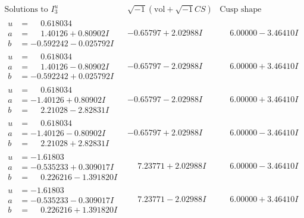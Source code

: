 \documentclass[1p]{elsarticle_modified}
\theoremstyle{definition}
\newcommand{\I}{\sqrt{-1}}
\begin{document}
$$\begin{array}{c|c|c}  
\text{Solutions to }I^u_{3}& \I (\text{vol} + \sqrt{-1}CS) & \text{Cusp shape}\\
 \hline 
\begin{aligned}
u &= \phantom{-}0.618034\phantom{ +0.000000I} \\
a &= \phantom{-}1.40126 + 0.80902 I \\
b &= -0.592242 - 0.025792 I\end{aligned}
 & -0.65797 + 2.02988 I & \phantom{-}6.00000 - 3.46410 I \\ \hline\begin{aligned}
u &= \phantom{-}0.618034\phantom{ +0.000000I} \\
a &= \phantom{-}1.40126 - 0.80902 I \\
b &= -0.592242 + 0.025792 I\end{aligned}
 & -0.65797 - 2.02988 I & \phantom{-}6.00000 + 3.46410 I \\ \hline\begin{aligned}
u &= \phantom{-}0.618034\phantom{ +0.000000I} \\
a &= -1.40126 + 0.80902 I \\
b &= \phantom{-}2.21028 - 2.82831 I\end{aligned}
 & -0.65797 - 2.02988 I & \phantom{-}6.00000 + 3.46410 I \\ \hline\begin{aligned}
u &= \phantom{-}0.618034\phantom{ +0.000000I} \\
a &= -1.40126 - 0.80902 I \\
b &= \phantom{-}2.21028 + 2.82831 I\end{aligned}
 & -0.65797 + 2.02988 I & \phantom{-}6.00000 - 3.46410 I \\ \hline\begin{aligned}
u &= -1.61803\phantom{ +0.000000I} \\
a &= -0.535233 + 0.309017 I \\
b &= \phantom{-}0.226216 - 1.391820 I\end{aligned}
 & \phantom{-}7.23771 + 2.02988 I & \phantom{-}6.00000 - 3.46410 I \\ \hline\begin{aligned}
u &= -1.61803\phantom{ +0.000000I} \\
a &= -0.535233 - 0.309017 I \\
b &= \phantom{-}0.226216 + 1.391820 I\end{aligned}
 & \phantom{-}7.23771 - 2.02988 I & \phantom{-}6.00000 + 3.46410 I \\ \hline\begin{aligned}

\end{aligned}
\end{array}$$
\end{document}
